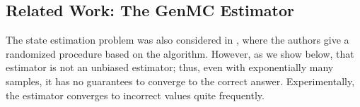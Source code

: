 \subsection{Related Work: The GenMC Estimator}

The state estimation problem was also considered in \cite{gator}, where the authors give a randomized procedure based on the \trust algorithm.
However, as we show below, that estimator is not an unbiased estimator; thus, even with exponentially many samples,
it has no guarantees to converge to the correct answer.
Experimentally, the estimator converges to incorrect values quite frequently.

